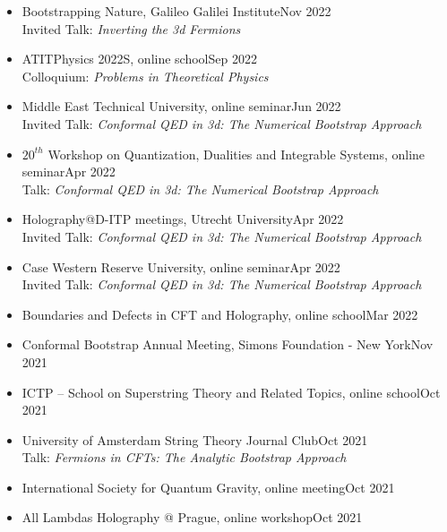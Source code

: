 \documentclass[a4paper,11pt]{article}
\begin{document}
\begin{itemize}[itemsep=.001em]
	\item[] Bootstrapping Nature, Galileo Galilei Institute\hfill Nov 2022
\\
\hspace*{1.8em}Invited Talk: \emph{Inverting the 3d Fermions}
	\item[] ATITPhysics 2022S, online school\hfill Sep 2022\\
\hspace*{1.8em}Colloquium: \emph{Problems in Theoretical Physics}
	\item[] Middle East Technical University, online seminar\hfill Jun 2022
\\
\hspace*{1.8em}Invited Talk: \emph{Conformal QED in 3d: The Numerical Bootstrap Approach}
	\item[] $20^{th}$ Workshop on
	Quantization, Dualities and Integrable Systems, online seminar\hfill Apr 2022
\\
\hspace*{1.8em}Talk: \emph{Conformal QED in 3d: The Numerical Bootstrap Approach}
	\item[] Holography@D-ITP meetings, Utrecht University\hfill Apr 2022
	\\
	\hspace*{1.8em}Invited Talk: \emph{Conformal QED in 3d: The Numerical Bootstrap Approach}
	\item[] Case Western Reserve University, online seminar\hfill Apr 2022
	\\
	\hspace*{1.8em}Invited Talk: \emph{Conformal QED in 3d: The Numerical Bootstrap Approach}
	\item[] Boundaries and Defects in CFT and Holography, online school\hfill Mar 2022
	\\
	\item[] Conformal Bootstrap Annual Meeting, Simons Foundation - New York\hfill Nov 2021
	\item[] ICTP -- School on Superstring Theory and Related Topics, online school\hfill Oct 2021
	\\
	\item[] University of Amsterdam String Theory Journal Club\hfill Oct 2021
	\\
	\hspace*{1.8em}Talk: \emph{Fermions in CFTs: The Analytic Bootstrap Approach}
	\item[] International Society for Quantum Gravity, online meeting\hfill Oct 2021
	\item[] All Lambdas Holography @ Prague, online workshop\hfill Oct 2021

\end{itemize}
\end{document}
